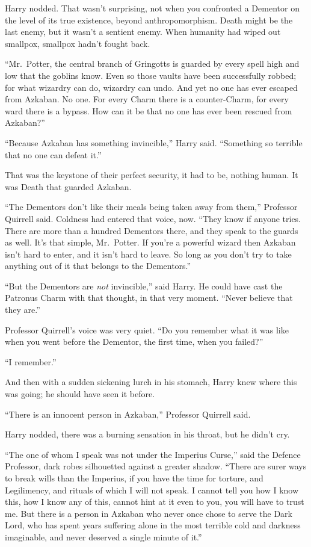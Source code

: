 Harry nodded. That wasn't surprising, not when you confronted a Dementor
on the level of its true existence, beyond anthropomorphism. Death might
be the last enemy, but it wasn't a sentient enemy. When humanity had
wiped out smallpox, smallpox hadn't fought back.

``Mr.~Potter, the central branch of Gringotts is guarded by every spell
high and low that the goblins know. Even so those vaults have been
successfully robbed; for what wizardry can do, wizardry can undo. And
yet no one has ever escaped from Azkaban. No one. For every Charm there
is a counter-Charm, for every ward there is a bypass. How can it be that
no one has ever been rescued from Azkaban?''

``Because Azkaban has something invincible,'' Harry said. ``Something so
terrible that no one can defeat it.''

That was the keystone of their perfect security, it had to be, nothing
human. It was Death that guarded Azkaban.

``The Dementors don't like their meals being taken away from them,''
Professor Quirrell said. Coldness had entered that voice, now. ``They
know if anyone tries. There are more than a hundred Dementors there, and
they speak to the guards as well. It's that simple, Mr.~Potter. If
you're a powerful wizard then Azkaban isn't hard to enter, and it isn't
hard to leave. So long as you don't try to take anything out of it that
belongs to the Dementors.''

``But the Dementors are \emph{not} invincible,'' said Harry. He could
have cast the Patronus Charm with that thought, in that very moment.
``Never believe that they are.''

Professor Quirrell's voice was very quiet. ``Do you remember what it was
like when you went before the Dementor, the first time, when you
failed?''

``I remember.''

And then with a sudden sickening lurch in his stomach, Harry knew where
this was going; he should have seen it before.

``There is an innocent person in Azkaban,'' Professor Quirrell said.

Harry nodded, there was a burning sensation in his throat, but he didn't
cry.

``The one of whom I speak was not under the Imperius Curse,'' said the
Defence Professor, dark robes silhouetted against a greater shadow.
``There are surer ways to break wills than the Imperius, if you have the
time for torture, and Legilimency, and rituals of which I will not
speak. I cannot tell you how I know this, how I know any of this, cannot
hint at it even to you, you will have to trust me. But there is a person
in Azkaban who never once chose to serve the Dark Lord, who has spent
years suffering alone in the most terrible cold and darkness imaginable,
and never deserved a single minute of it.''

